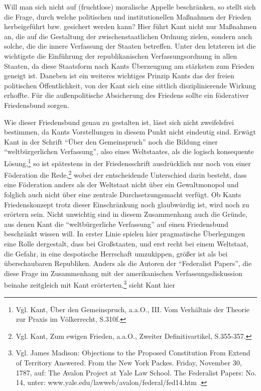 \documentclass[12pt,a4paper,ngerman]{article}
\begin{document}
Will man sich nicht auf (fruchtlose) moralische Appelle beschränken,
so stellt sich die Frage, durch welche politischen und
institutionellen Maßnahmen der Frieden herbeigeführt bzw. gesichert
werden kann? Hier führt Kant nicht nur Maßnahmen an, die auf die
Gestaltung der zwischenstaatlichen Ordnung zielen, sondern auch
solche, die die innere Verfassung der Staaten betreffen. Unter den
letzteren ist die wichtigste die Einführung der republikanischen
Verfassungsordnung in allen Staaten, da diese Staatsform nach Kants
Überzeugung am stärksten zum Frieden geneigt ist. Daneben ist ein
weiteres wichtiges Prinzip Kants das der freien politischen
Öffentlichkeit, von der Kant sich eine sittlich disziplinierende
Wirkung erhoffte. Für die außenpolitische Absicherung des Friedens
sollte ein föderativer Friedensbund sorgen.

Wie dieser Friedensbund genau zu gestalten ist, lässt sich nicht
zweifelsfrei bestimmen, da Kants Vorstellungen in diesem Punkt
nicht eindeutig sind. Erwägt Kant in der Schrift "`Über den Gemeinspruch"'
noch die Bildung einer "`weltbürgerlichen Verfassung"', also eines
Weltstaates, als die logisch konsequente Lösung,\footnote{Vgl. Kant,
  Über den Gemeinspruch, a.a.O., III. Vom Verhältnis der Theorie zur
  Praxis im Völkerrecht, S.310f.} so ist spätestens in der
Friedensschrift ausdrücklich nur noch von einer Föderation die
Rede,\footnote{Vgl. Kant, Zum ewigen Frieden, a.a.O., Zweiter
  Definitivartikel, S.355-357.} wobei der entscheidende Unterschied
darin besteht, dass eine Föderation anders als der Weltstaat nicht
über ein Gewaltmonopol und folglich auch nicht über eine zentrale
Durchsetzungsmacht verfügt. Ob Kants Friedenskonzept trotz dieser
Einschränkung noch glaubwürdig ist, wird noch zu erörtern sein.  Nicht
unwichtig sind in diesem Zusammenhang auch die Gründe, aus denen Kant
die "`weltbürgerliche Verfassung"' auf einen Friedensbund beschränkt
wissen will. In erster Linie spielen hier pragmatische Überlegungen
eine Rolle dergestalt, dass bei Großstaaten, und erst recht bei einem
Weltstaat, die Gefahr, in eine despotische Herrschaft umzukippen,
größer ist als bei überschaubaren Republiken. Anders als die Autoren
der "`Federalist Papers"', die diese Frage im Zusammenhang mit der
amerikanischen Verfassungsdiskussion beinahe zeitgleich mit Kant
erörterten,\footnote{Vgl. James Madison: Objections to the Proposed
  Constitution From Extend of Territory Answered. From the New York
  Packes. Friday, November 30, 1787, auf: The Avalon Project at Yale
  Law School. The Federalist Papers: No. 14, unter:
  www.yale.edu/lawweb/avalon/federal/fed14.htm .} sieht Kant hier
\end{document}
